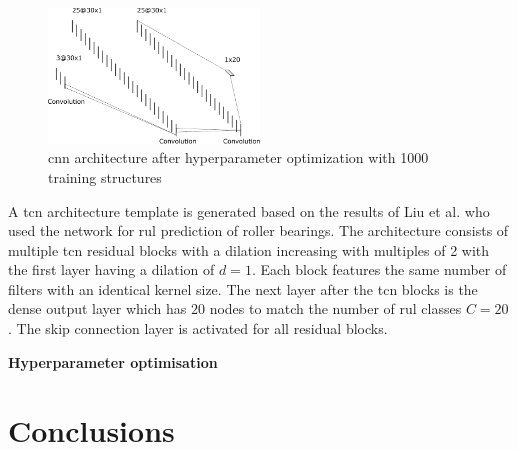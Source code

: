 \documentclass[conference]{IEEEtran}
\begin{document}
\begin{figure}[htp]
	\centering
	\includegraphics[width=0.5\textwidth]{cnn_architecture_1000_structures.pdf}
	\caption{\gls{cnn} architecture after hyperparameter optimization with 1000 training structures}
	\label{fig:cnn_architecture_1000_structures}
\end{figure}

A \gls{tcn} architecture template is generated based on the results of Liu et al. \cite{Liu2019} who used the network for \gls{rul} prediction of roller bearings. The architecture consists of multiple \gls{tcn} residual blocks with a dilation increasing with multiples of 2 with the first layer having a dilation of $ d = 1 $. Each block features the same number of filters with an identical kernel size. The next layer after the \gls{tcn} blocks is the dense output layer which has $ 20 $ nodes to match the number of \gls{rul} classes $ C = 20 $. The skip connection layer is activated for all residual blocks.


\noindent
\textbf{Hyperparameter optimisation}





\section{Conclusions}
\label{sec:conclusions}







\printbibliography
\end{document}
